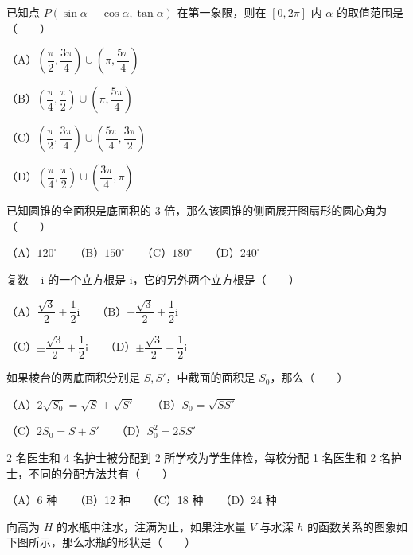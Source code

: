 \begin{question}
已知点 $P(\sin\alpha-\cos\alpha,\tan\alpha)$ 在第一象限，则在 $[0,2\pi]$ 内 $\alpha$ 的取值范围是\mbox{（　　）}

（A）$\left(\dfrac\pi2,\dfrac{3\pi}4\right)\cup\left(\pi,\dfrac{5\pi}4\right)$

（B）$\left(\dfrac\pi4,\dfrac\pi2\right)\cup\left(\pi,\dfrac{5\pi}4\right)$

（C）$\left(\dfrac\pi2,\dfrac{3\pi}4\right)\cup\left(\dfrac{5\pi}4,\dfrac{3\pi}2\right)$

（D）$\left(\dfrac\pi4,\dfrac\pi2\right)\cup\left(\dfrac{3\pi}4,\pi\right)$

\end{question}
\begin{question}
已知圆锥的全面积是底面积的 3 倍，那么该圆锥的侧面展开图扇形的圆心角为\mbox{（　　）}

（A）$120^\circ$　　（B）$150^\circ$　　（C）$180^\circ$　　（D）$240^\circ$

\end{question}
\begin{question}
复数 $-\mathrm{i}$ 的一个立方根是 $\mathrm{i}$，它的另外两个立方根是\mbox{（　　）}

（A）$\dfrac{\sqrt3}2\pm\dfrac12\mathrm{i}$　　（B）$-\dfrac{\sqrt3}2\pm\dfrac12\mathrm{i}$

（C）$\pm\dfrac{\sqrt3}2+\dfrac12\mathrm{i}$　　（D）$\pm\dfrac{\sqrt3}2-\dfrac12\mathrm{i}$

\end{question}
\begin{question}
如果棱台的两底面积分别是 $S,S'$，中截面的面积是 $S_0$，那么\mbox{（　　）}

（A）$2\sqrt{S_0}=\sqrt{S}+\sqrt{S'}$　　（B）$S_0=\sqrt{SS'}$

（C）$2S_0=S+S'$　　（D）$S_0^2=2SS'$

\end{question}
\begin{question}
2 名医生和 4 名护士被分配到 2 所学校为学生体检，每校分配 1 名医生和 2 名护士，不同的分配方法共有\mbox{（　　）}

（A）6 种　　（B）12 种　　（C）18 种　　（D）24 种

\Needspace{0.4\textheight}
\end{question}
\begin{question}
向高为 $H$ 的水瓶中注水，注满为止，如果注水量 $V$ 与水深 $h$ 的函数关系的图象如下图所示，那么水瓶的形状是\mbox{（　　）}
\nopagebreak[4]
\begin{center}\end{center}
\nopagebreak[4]
\end{question}
